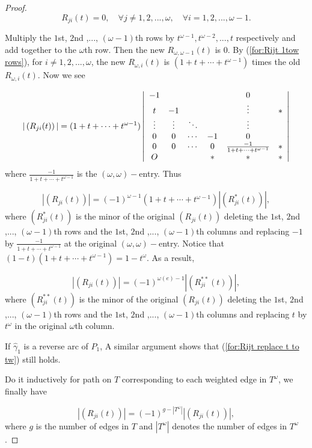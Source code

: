 \documentclass{amsart}
\theoremstyle{definition}
\theoremstyle{remark}
\numberwithin{equation}{subsection}
\begin{document}
\begin{proof}
\begin{equation}
R_{ji}(t)=0, \quad \forall j\neq 1,2,...,\omega, \quad \forall i=1,2,...,\omega-1. \nonumber
\end{equation}

Multiply the $1$st, $2$nd ,..., $(\omega-1)$th rows by $t^{\omega-1},t^{\omega-2},...,t$ respectively and add together to the $\omega$th row. Then the new $R_{\omega,\omega-1}(t)$ is $0$. By (\ref{for:Rijt 1tow rows}), for $i\neq 1,2,...,\omega$, the new $R_{\omega,i}(t)$ is $(1+t+\cdots+t^{\omega-1})$ times the old $R_{\omega,i}(t)$. Now we see

\begin{equation}
|\left(R_{ji}(t)\right)|=(1+t+\cdots+t^{\omega-1})\left|\begin{array}[]{cccccc}
-1 & & & & 0 & \\
t & -1 & & & \vdots & *\\
\vdots & \vdots & \ddots & & \vdots & \\
0 & 0 & \cdots & -1 & 0 &  \\
0 & 0 & \cdots & 0  & \frac{-1}{1+t+\cdots+t^{\omega-1}}  & * \\
O &   &        & *  & * & *
\end{array}\right|
\end{equation}
where $\frac{-1}{1+t+\cdots+t^{\omega-1}}$ is the $(\omega,\omega)-$entry. Thus

\begin{equation}
|\left(R_{ji}(t)\right)|=(-1)^{\omega-1}(1+t+\cdots+t^{\omega-1})|\left(R^{*}_{ji}(t)\right)|,
\end{equation}
where $(R^{*}_{ji}(t))$ is the minor of the original $(R_{ji}(t))$ deleting the $1$st, $2$nd ,..., $(\omega-1)$th rows and the $1$st, $2$nd ,..., $(\omega-1)$th columns and replacing $-1$ by $\frac{-1}{1+t+\cdots+t^{\omega-1}}$ at the original $(\omega,\omega)-$entry. Notice that $(1-t)(1+t+\cdots+t^{\omega-1})=1-t^{\omega}$. As a result,

\begin{equation}
|\left(R_{ji}(t)\right)|=(-1)^{\omega(e)-1}|\left(R_{ji}^{**}(t)\right)|, \label{for:Rijt replace t to tw}
\end{equation}
where $\left(R_{ji}^{**}(t)\right)$ is the minor of the original $\left(R_{ji}(t)\right)$ deleting the $1$st, $2$nd ,..., $(\omega-1)$th rows and the $1$st, $2$nd ,..., $(\omega-1)$th columns and replacing $t$ by $t^{\omega}$ in the original $\omega$th column.

If $\hat{\gamma}_{1}$ is a reverse arc of $P_{1}$, A similar argument shows that (\ref{for:Rijt replace t to tw}) still holds.

Do it inductively for path on $T$ corresponding to each weighted edge in $T^{\omega}$, we finally have

\begin{equation}
|\left(R_{ji}(t)\right)|=(-1)^{g-|T^{\omega}|}|\left(R_{ji}(t)\right)|, \nonumber
\end{equation}
where $g$ is the number of edges in $T$ and $|T^{\omega}|$ denotes the number of edges in $T^{\omega}$.
\end{proof}
\end{document}
